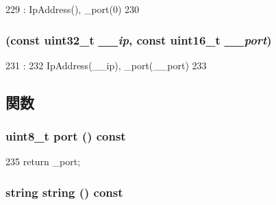 \begin{DoxyCode}
229                  : IpAddress(), _port(0)
230     {}
\end{DoxyCode}
\hypertarget{structNet_1_1IpWithPort_a746247c56e595fc6f43a1e0795141dc8}{
\subsubsection[{IpWithPort}]{ (const {\bf uint32\_\-t} {\em \_\-\_\-ip}, \/  const uint16\_\-t {\em \_\-\_\-port})}}
\label{structNet_1_1IpWithPort_a746247c56e595fc6f43a1e0795141dc8}



\begin{DoxyCode}
231                                                            :
232         IpAddress(__ip), _port(__port)
233     {}

\end{DoxyCode}


\subsection{関数}
\hypertarget{structNet_1_1IpWithPort_a6eef45013e8da0731ab2f08b19bac9fd}{
\subsubsection[{port}]{\setlength{\rightskip}{0pt plus 5cm}uint8\_\-t port () const}}
\label{structNet_1_1IpWithPort_a6eef45013e8da0731ab2f08b19bac9fd}



\begin{DoxyCode}
235 { return _port; }
\end{DoxyCode}
\hypertarget{structNet_1_1IpWithPort_a14a0e4fdb44bd7be64a3c6e5d94f8f0e}{
\subsubsection[{string}]{\setlength{\rightskip}{0pt plus 5cm}string string () const}}
\label{structNet_1_1IpWithPort_a14a0e4fdb44bd7be64a3c6e5d94f8f0e}



